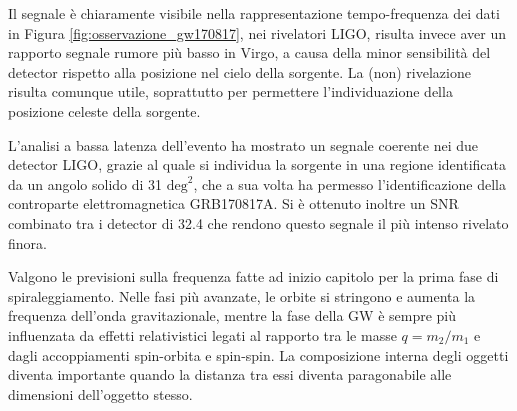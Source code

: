 Il segnale è chiaramente visibile nella rappresentazione tempo-frequenza dei dati in Figura  \ref{fig:osservazione_gw170817}, nei rivelatori LIGO, risulta invece aver un rapporto segnale rumore più basso in Virgo, a causa della minor sensibilità del detector rispetto alla posizione nel cielo della sorgente. La (non) rivelazione risulta comunque utile, soprattutto per permettere l'individuazione della posizione celeste della sorgente.

L'analisi a bassa latenza dell'evento ha mostrato un segnale coerente nei due detector LIGO, grazie al quale si individua la sorgente in una regione identificata da un angolo solido di 31 $\text{deg}^2$, che a sua volta ha permesso l'identificazione della controparte elettromagnetica GRB170817A. 
Si è ottenuto inoltre un SNR combinato tra i detector di 32.4 che rendono questo segnale il più intenso rivelato finora\cite{Abbott_2017a}.

Valgono le previsioni sulla frequenza fatte ad inizio capitolo per la prima fase di spiraleggiamento. Nelle fasi più avanzate, le orbite si stringono e aumenta la frequenza dell'onda gravitazionale, mentre la fase della GW è sempre più influenzata da effetti relativistici legati al rapporto tra le masse $q = m_2/m_1$ e dagli accoppiamenti spin-orbita e spin-spin. La composizione interna degli oggetti diventa importante quando la distanza tra essi diventa paragonabile alle dimensioni dell'oggetto stesso. 


